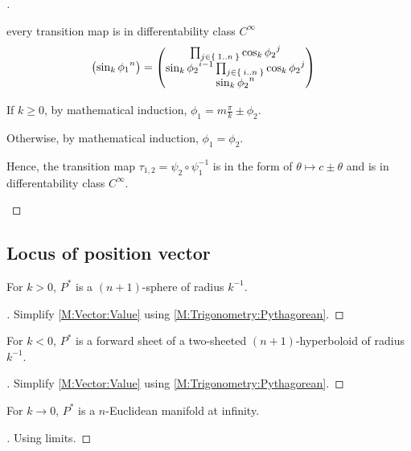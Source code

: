 \documentclass[stu, babel, american, biblatex, a4paper, leqno, draftall]{apa7}
\begin{document}
\begin{proof}[]
\begin{subproof}{every transition map is in differentability class $C^\infty$}
\begin{align*}
\begin{pmatrix}
                \sin_k{{\tensor{{\phi_1}}{^n}}}                                                        \\
            \end{pmatrix}
                                                                                                                      & =
            \begin{pmatrix}
                \prod_{j\in\Set{1..n}}{\cos_k{\tensor{{\phi_2}}{^j}}}                                  \\
                \sin_k{\tensor{{\phi_2}}{^{i-1}}}\prod_{j\in\Set{i..n}}{\cos_k{\tensor{{\phi_2}}{^j}}} \\
                \sin_k{{\tensor{{\phi_2}}{^n}}}                                                        \\
            \end{pmatrix}
        \end{align*}

        If $k\ge 0$, by mathematical induction, $\phi_1 = m\frac{\pi}{k}\pm\phi_2$.

        Otherwise, by mathematical induction, $\phi_1 = \phi_2$.

        Hence, the transition map $\tau_{1,2} = \psi_2 \circ \psi_1^{-1}$
        is in the form of $\theta \mapsto c\pm\theta$
        and is in differentability class $C^\infty$.
    \end{subproof}
\end{proof}
\subsection{Locus of position vector}
\begin{lemma}\label{SphericalLocus}
    For $k>0$, $P^\ast$ is a $\left(n+1\right)$-sphere of radius $k^{-1}$.
\end{lemma}
\begin{proof}[]
    Simplify \cref{M:Vector:Value} using \cref{M:Trigonometry:Pythagorean}.
\end{proof}
\begin{lemma}\label{HyperbolicLocus}
    For $k<0$, $P^\ast$ is a forward sheet of a two-sheeted $\left(n+1\right)$-hyperboloid of radius $k^{-1}$.
\end{lemma}
\begin{proof}[]
    Simplify \cref{M:Vector:Value} using \cref{M:Trigonometry:Pythagorean}.
\end{proof}
\begin{lemma}\label{EuclideanLocus}
    For $k\to0$, $P^\ast$ is a $n$-Euclidean manifold at infinity.
\end{lemma}
\begin{proof}[]
    Using limits.
\end{proof}
\end{document}
